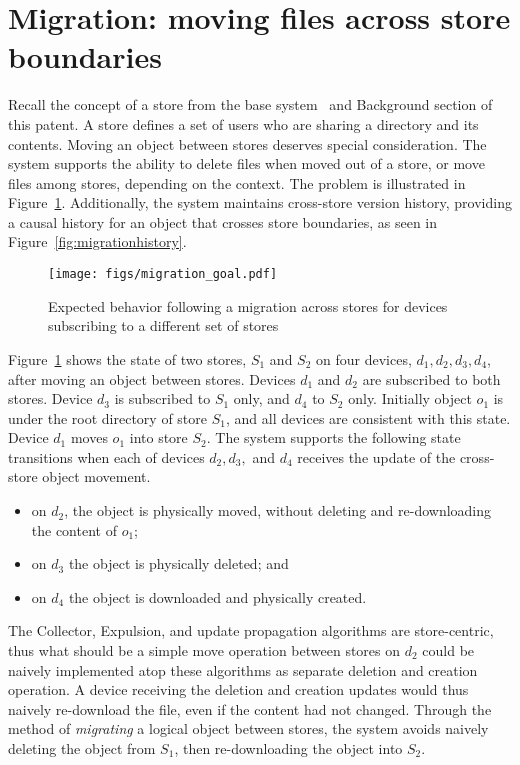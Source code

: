 \section*{Migration: moving files across store boundaries}

Recall the concept of a store from the base system~\cite{wang:patent2012} and
Background section of this patent. A store defines a set of users who are
sharing a directory and its contents. Moving an object between stores deserves
special consideration. The system supports the ability to delete files when
moved out of a store, or move files among stores, depending on the context. The
problem is illustrated in Figure~\ref{fig:migrationgoal}. Additionally, the
system maintains cross-store version history, providing a causal history for an
object that crosses store boundaries, as seen in
Figure~\ref{fig:migrationhistory}.

\begin{figure}[t]
\centering
\texttt{[image: figs/migration\_goal.pdf]}
\caption{Expected behavior following a migration across stores for devices
subscribing to a different set of stores}
\label{fig:migrationgoal}
\end{figure}

Figure~\ref{fig:migrationgoal} shows the state of two stores, $S_1$ and $S_2$
on four devices, $d_1, d_2, d_3, d_4$, after moving an object between stores.
Devices $d_1$ and $d_2$ are subscribed to both stores. Device $d_3$ is
subscribed to $S_1$ only, and $d_4$ to $S_2$ only. Initially object $o_1$ is
under the root directory of store $S_1$, and all devices are consistent with
this state. Device $d_1$ moves $o_1$ into store $S_2$. The system supports the
following state transitions when each of devices $d_2, d_3,$ and $d_4$ receives
the update of the cross-store object movement.
\begin{itemize}
\item on $d_2$, the object is physically moved, without deleting and
re-downloading the content of $o_1$;
\item on $d_3$ the object is physically deleted; and
\item on $d_4$ the object is downloaded and physically created.
\end{itemize}
The Collector, Expulsion, and update propagation algorithms are store-centric,
thus what should be a simple move operation between stores on $d_2$ could be
naively implemented atop these algorithms as separate deletion and creation
operation. A device receiving the deletion and creation updates would thus
naively re-download the file, even if the content had not changed. Through the
method of {\em migrating} a logical object between stores, the system avoids
naively deleting the object from $S_1$, then re-downloading the object into
$S_2$.

